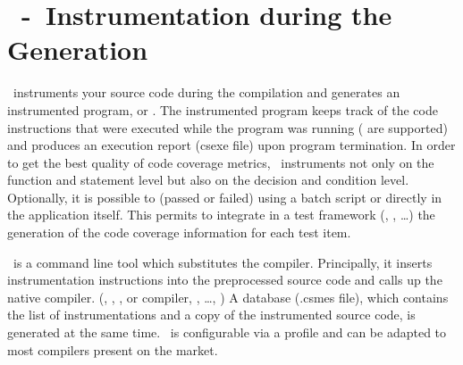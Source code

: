 
\section{\CoverageScanner~-~Instrumentation during the Generation}

   \CoverageScanner\ instruments your source code during the compilation and
   generates an instrumented program,
   or . 
   The instrumented program keeps track of the code instructions that were
   executed while the program was running (
   are supported) and produces an execution report (csexe file)
   upon program termination. In order to get the best quality of code coverage
   metrics, \CoverageScanner\ instruments not only on the function and
   statement level but also on the decision and condition level. Optionally, it
   is possible to 
    (passed or failed) using a batch script or directly in the application itself. 
   This permits to integrate in a test framework (, , 
       \ldots) the generation of the code coverage information for each test item. 


   \par\bigskip

   \CoverageScanner\ is a command line tool which substitutes the compiler. 
   Principally, it inserts instrumentation instructions into the preprocessed
   source code and calls up the native compiler. 
   (,  , ,  or  compiler, , \ldots, ) 
   A database (.csmes file), which contains the list of instrumentations and a 
   copy of the instrumented source code, is generated at the same time.
   \CoverageScanner\ is configurable via a profile and can be 
   adapted to most compilers present on the market.


